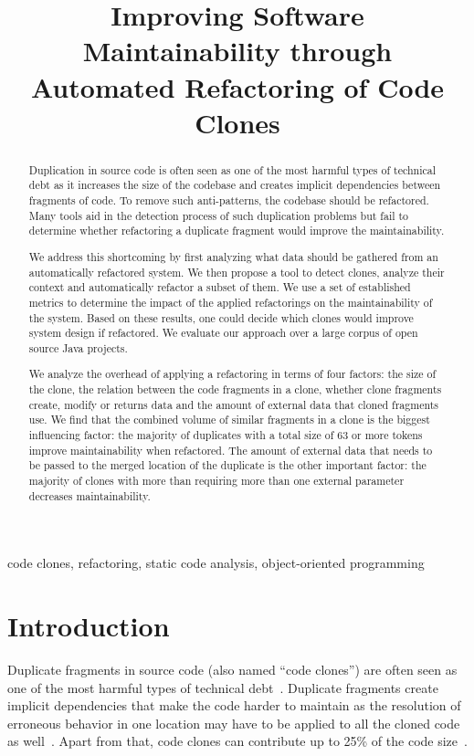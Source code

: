 \documentclass[]{IEEEtran}
\begin{document}
\title{Improving Software Maintainability through Automated Refactoring of Code Clones}

\maketitle

\begin{abstract}
Duplication in source code is often seen as one of the most harmful types of technical debt as it increases the size of the codebase and creates implicit dependencies between fragments of code. To remove such anti-patterns, the codebase should be refactored. Many tools aid in the detection process of such duplication problems but fail to determine whether refactoring a duplicate fragment would improve the maintainability.

We address this shortcoming by first analyzing what data should be gathered from an automatically refactored system. We then propose a tool to detect clones, analyze their context and automatically refactor a subset of them. We use a set of established metrics to determine the impact of the applied refactorings on the maintainability of the system. Based on these results, one could decide which clones would improve system design if refactored. We evaluate our approach over a large corpus of open source Java projects.

We analyze the overhead of applying a refactoring in terms of four factors: the size of the clone, the relation between the code fragments in a clone, whether clone fragments create, modify or returns data and the amount of external data that cloned fragments use. We find that the combined volume of similar fragments in a clone is the biggest influencing factor: the majority of duplicates with a total size of 63 or more tokens improve maintainability when refactored. The amount of external data that needs to be passed to the merged location of the duplicate is the other important factor: the majority of clones with more than requiring more than one external parameter decreases maintainability.
\end{abstract}

\begin{IEEEkeywords}
code clones, refactoring, static code analysis, object-oriented programming
\end{IEEEkeywords}

\section{Introduction}
Duplicate fragments in source code (also named ``code clones'') are often seen as one of the most harmful types of technical debt~\cite{fowler2018refactoring}. Duplicate fragments create implicit dependencies that make the code harder to maintain as the resolution of erroneous behavior in one location may have to be applied to all the cloned code as well~\cite{ostberg2014automatically}. Apart from that, code clones can contribute up to 25\% of the code size~\cite{bruntink2005use}.
\end{document}
